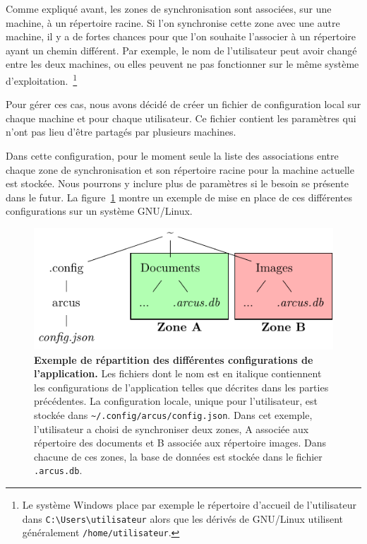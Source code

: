 Comme expliqué avant, les zones de synchronisation sont associées, sur une machine, à un répertoire racine. Si l'on synchronise cette zone avec une autre machine, il y a de fortes chances pour que l'on souhaite l'associer à un répertoire ayant un chemin différent. Par exemple, le nom de l'utilisateur peut avoir changé entre les deux machines, ou elles peuvent ne pas fonctionner sur le même système d'exploitation.~\footnote{Le système Windows place par exemple le répertoire d'accueil de l'utilisateur dans \texttt{C:\textbackslash{}Users\textbackslash{}utilisateur} alors que les dérivés de GNU/Linux utilisent généralement \texttt{/home/utilisateur}.}

Pour gérer ces cas, nous avons décidé de créer un fichier de configuration local sur chaque machine et pour chaque utilisateur. Ce fichier contient les paramètres qui n'ont pas lieu d'être partagés par plusieurs machines.

Dans cette configuration, pour le moment seule la liste des associations entre chaque zone de synchronisation et son répertoire racine pour la machine actuelle est stockée. Nous pourrons y inclure plus de paramètres si le besoin se présente dans le futur. La figure~\ref{fig:conception-syncdir} montre un exemple de mise en place de ces différentes configurations sur un système GNU/Linux.

\begin{figure}[h!]
    \centering
    \includegraphics{figures/syncdir}
    \caption{\textbf{Exemple de répartition des différentes configurations de l'application.} Les fichiers dont le nom est en italique contiennent les configurations de l'application telles que décrites dans les parties précédentes. La configuration locale, unique pour l'utilisateur, est stockée dans \texttt{\textasciitilde{}/.config/arcus/config.json}. Dans cet exemple, l'utilisateur a choisi de synchroniser deux zones, A associée aux répertoire des documents et B associée aux répertoire images. Dans chacune de ces zones, la base de données est stockée dans le fichier \texttt{.arcus.db}.}
    \label{fig:conception-syncdir}
\end{figure}

